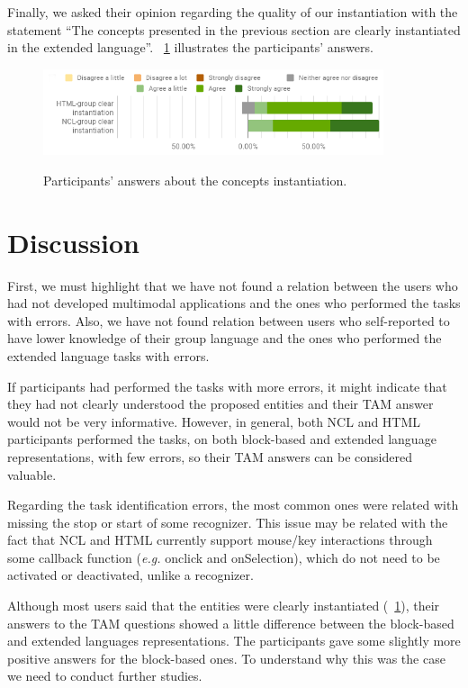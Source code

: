 \documentclass[
  doutorado,
  american
]{ThesisPUC}
\newcommand{\fig}[1]{\figurename~\ref{#1}}
\newcommand{\captionvspace}{\vspace{-1.3em}}
\begin{document}
Finally, we asked their opinion regarding the quality of our instantiation with
the statement “The concepts presented in the previous section are clearly
instantiated in the extended language”. \fig{fig:lang-res4} illustrates the
participants’ answers.

\begin{figure}[!ht]
\begin{center}
	\includegraphics[width=10cm, keepaspectratio]{img/img26.png}
	\caption{Participants’ answers about the concepts instantiation.}
    \captionvspace
	\label{fig:lang-res4}
\end{center}
\end{figure}

\section{Discussion}
\label{sec:evaluation:discussion}

First, we must highlight that we have not found a relation between the users who
had not developed multimodal applications and the ones who performed the tasks
with errors. Also, we have not found relation between users who self-reported to
have lower knowledge of their group language and the ones who performed the
extended language tasks with errors.

If participants had performed the tasks with more errors, it might indicate that
they had not clearly understood the proposed entities and their TAM answer would
not be very informative. However, in general, both NCL and HTML participants
performed the tasks, on both block-based and extended language representations,
with few errors, so their TAM answers can be considered valuable.

Regarding the task identification errors, the most common ones were related with
missing the stop or start of some recognizer. This issue may be related with the
fact that NCL and HTML currently support mouse/key interactions through some
callback function (\textit{e.g.} onclick and onSelection), which do not need to be
activated or deactivated, unlike a recognizer.

Although most users said that the entities were clearly instantiated
(\fig{fig:lang-res4}), their answers to the TAM questions showed a little
difference between the block-based and extended languages representations. The
participants gave some slightly more positive answers for the block-based ones.
To understand why this was the case we need to conduct further studies. 
\end{document}
